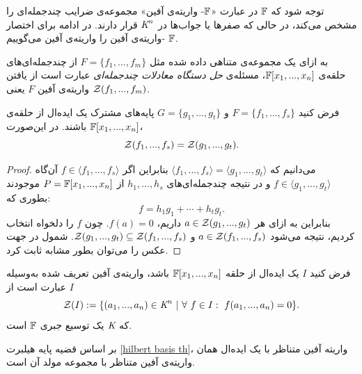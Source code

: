 توجه شود که 
$\mathbb{F}$
در عبارت
«$\mathbb{F}$-
واریته‌ی آفین» مجموعه‌ی ضرایب چندجمله‌ای را مشخص می‌کند، در حالی که صفرها یا جواب‌ها در 
$\textit{K}^{n}$
قرار دارند. در ادامه برای اختصار 
$\mathbb{F}$
-واریته‌ی آفین را واریته‌ی آفین می‌گوییم.
\begin{definition}
	به ازای یک مجموعه‌ی متناهی داده شده مثل 
	$F = \{f_{1},...,f_{m}\}$
	از چندجمله‌ای‌های حلقه‌ی 
	$\mathbb{F}[x_{1},...,x_{n}]$،
	مسئله‌ی 
	\textit{حل دستگاه معادلات چندجمله‌ای }
	عبارت است از یافتن واریته‌ی آفین 
	$F$
	یعنی 
	${\mathcal Z} (f_{1},...,f_{m})$.
\end{definition}

\begin{lemma}
	فرض کنید 
	$F = \{f_{1},...,f_{s}\}$
	و
	$G = \{g_{1},...,g_{t}\}$
	پایه‌‌های مشترک یک ایده‌ال از حلقه‌ی 
	$\mathbb{F}[x_{1},...,x_{n}]$
	باشند. در این‌صورت،
	$${\mathcal Z}(f_{1},...,f_{s}) = {\mathcal Z}(g_{1},...,g_{t}).$$
\end{lemma}
\begin{proof}
	می‌دانیم که 
	$\langle f_{1},...,f_{s}\rangle = \langle g_{1},...,g_{t}\rangle$
	بنابراین اگر 
	$f\in\langle f_{1},...,f_{s}\rangle$
	آن‌گاه 
	$f\in\langle g_{1},...,g_{t}\rangle$
	و در نتیجه چندجمله‌ای‌های 
	$h_{1},...,h_{s}$
	از 
	$P = \mathbb{F}[x_{1},...,x_{n}]$
	موجودند بطوری که:
	$$f = h_{1}g_{1} + \cdots + h_{t}g_{t}.$$
	بنابراین به ازای هر 
	$a\in {\mathcal Z}(g_{1},...,g_{t})$
	داریم،
	$f(a) = 0$.
	چون
	$f$
	را دلخواه انتخاب کردیم، نتیجه می‌شود 
	$a\in {\mathcal Z}(f_{1},...,f_{s})$
	و
	${\mathcal Z}(g_{1},...,g_{t})\subseteq {\mathcal Z}(f_{1},...,f_{s})$.
	شمول در جهت عکس  را می‌توان بطور مشابه ثابت کرد.
\end{proof}

\begin{definition}
	فرض کنید 
	$I$
	یک ایده‌ال از حلقه‌ 
	$\mathbb{F}[x_{1},...,x_{n}]$
	باشد، واریته‌ی آفین تعریف شده به‌وسیله‌ 
	$I$
	عبارت است از
	$${\mathcal Z}(I):=\{(a_{1},...,a_{n})\in\textit{K}^{n} \ | \ \forall \ f\in I: \  f(a_{1},...,a_{n}) = 0\}.$$
	که 
	$\textit{K}$
	یک توسیع جبری
	$\mathbb{F}$
	است.
\end{definition}

بر اساس قضیه‌  پایه‌  هیلبرت
\ref{hilbert basis th}،
 واریته‌  آفین متناظر با یک ایده‌ال همان واریته‌ی آفین متناظر با مجموعه‌  مولد آن است. 

